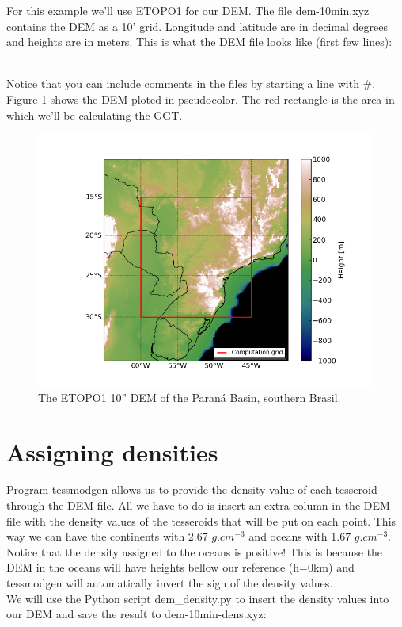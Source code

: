 \documentclass[a4paper]{article}
\begin{document}
For this example we'll use ETOPO1 for our DEM.
The file dem-10min.xyz contains the DEM as a 10' grid. Longitude and latitude are
in decimal degrees and heights are in meters.
This is what the DEM file looks like (first few lines):



\hfill\\
\noindent Notice that you can include comments in the files by starting a line
with \#.
Figure \ref{fig:dem} shows the DEM ploted in pseudocolor. The red rectangle is
the area in which we'll be calculating the GGT.

\begin{figure}[htb]
    \centering
        \includegraphics[width=\textwidth]{dem-10min.png}
    \caption{The ETOPO1 10'' DEM of the Paran\'a Basin, southern Brasil.
    \label{fig:dem}}
\end{figure}

\section{Assigning densities}

Program tessmodgen allows us to provide the density value of each tesseroid
through the DEM file. All we have to do is insert an extra column in the DEM
file with the density values of the tesseroids that will be put on each point.
This way we can have the continents with 2.67 $g.cm^{-3}$ and oceans with 1.67 $g.cm^{-3}$.
Notice that the density assigned to the oceans is positive! This is because the
DEM in the oceans will have heights bellow our reference (h=0km) and tessmodgen
will automatically invert the sign of the density values.
\\
\indent We will use the Python script dem\_density.py to insert the density values into our
DEM and save the result to dem-10min-dens.xyz:
\end{document}
